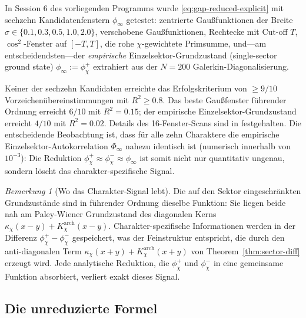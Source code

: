 \documentclass[a4paper,10pt,twocolumn]{article}
\theoremstyle{definition}
\theoremstyle{remark}
\newtheorem{remark}[theorem]{Bemerkung}
\newcommand{\chifn}{\chi}
\begin{document}
In Session 6 des vorliegenden Programms wurde \eqref{eq:gap-reduced-explicit}
mit sechzehn Kandidatenfenstern $\phi_\infty$ getestet: zentrierte Gaußfunktionen der
Breite $\sigma\in\{0.1,0.3,0.5,1.0,2.0\}$, verschobene Gaußfunktionen, Rechtecke
mit Cut-off $T$, $\cos^2$-Fenster auf $[-T,T]$, die rohe
$\chifn$-gewichtete Primsumme, und---am entscheidendsten---der \emph{empirische}
Einzelsektor-Grundzustand (single-sector ground state)
$\phi_\infty:=\phi_{\chifn}^+$ extrahiert aus der $N=200$ Galerkin-Diagonalisierung.

Keiner der sechzehn Kandidaten erreichte das Erfolgskriterium von
$\geq\!9/10$ Vorzeichenübereinstimmungen mit $R^2\geq 0.8$. Das beste
Gaußfenster führender Ordnung erreicht $6/10$ mit $R^2=0.15$; der
empirische Einzelsektor-Grundzustand erreicht $4/10$ mit
$R^2=0.02$. Details des 16-Fenster-Scans sind in
\cite{Woche4Validation} festgehalten. Die entscheidende Beobachtung ist, dass für alle
zehn Charaktere die empirische Einzelsektor-Autokorrelation
$\Phi_\infty$ nahezu identisch ist (numerisch innerhalb von $10^{-3}$):
Die Reduktion $\phi_{\chifn}^+\approx\phi_{\chifn}^-\approx
\phi_\infty$ ist somit nicht nur quantitativ ungenau, sondern
löscht das charakter-spezifische Signal.

\begin{remark}[Wo das Charakter-Signal lebt]
\label{rem:signal-locus}
Die auf den Sektor eingeschränkten Grundzustände sind in führender Ordnung dieselbe
Funktion: Sie liegen beide nah am Paley-Wiener Grundzustand des
diagonalen Kerns $\kappa_{\chifn}(x-y)+K^{\mathrm{arch}}_{\chifn}
(x-y)$. Charakter-spezifische Informationen werden in der Differenz
$\phi_{\chifn}^+-\phi_{\chifn}^-$ gespeichert, was der Feinstruktur
entspricht, die durch den anti-diagonalen Term $\kappa_{\chifn}(x+y)+
K^{\mathrm{arch}}_{\chifn}(x+y)$ von Theorem~\ref{thm:sector-diff} erzeugt wird.
Jede analytische Reduktion, die $\phi_{\chifn}^+$ und
$\phi_{\chifn}^-$ in eine gemeinsame Funktion absorbiert, verliert exakt dieses Signal.
\end{remark}

\subsection{Die unreduzierte Formel}
\label{sec:formula-unreduced}
\end{document}
